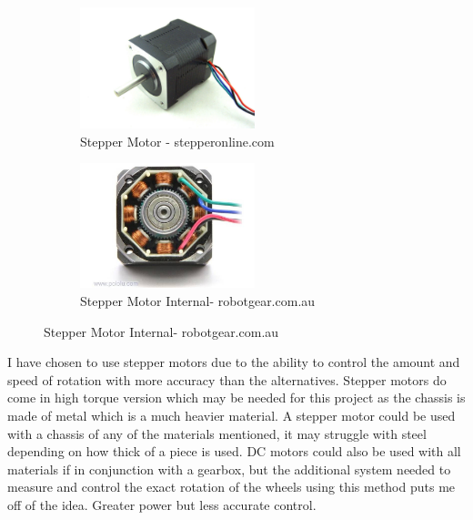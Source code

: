\begin{itemize}
\begin{figure}[H]
\centering
\begin{subfigure}
	\centering
        \includegraphics[width=2.0in] {Images/stepper.jpg}
        \caption{Stepper Motor - stepperonline.com}
        \label{Stepper Motor}
\end{subfigure}
\begin{subfigure}
        \centering
        \includegraphics[width=2.0in] {Images/stepper-internal.jpg}
        \caption{Stepper Motor Internal- robotgear.com.au}
        \label{Stepper Motor Internal}
\end{subfigure}
\end{figure}
\end{itemize}

I have chosen to use stepper motors due to the ability to control the amount and speed of rotation with more accuracy than the alternatives.  Stepper motors do come in high torque version which may be needed for this project as the chassis is made of metal which is a much heavier material.  A stepper motor could be used with a chassis of any of the materials mentioned, it may struggle with steel depending on how thick of a piece is used.  DC motors could also be used with all materials if in conjunction with a gearbox, but the additional system needed to measure and control the exact rotation of the wheels using this method puts me off of the idea.  Greater power but less accurate control.
